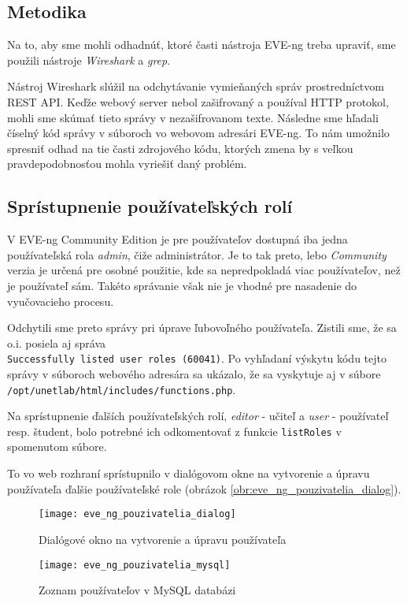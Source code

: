 \subsection{Metodika}

Na to, aby sme mohli odhadnúť, ktoré časti nástroja EVE-ng treba upraviť, sme použili nástroje \emph{Wireshark} a \emph{grep}.

Nástroj Wireshark slúžil na odchytávanie vymieňaných správ prostredníctvom REST API. Keďže webový server nebol zašifrovaný a používal HTTP protokol, mohli sme skúmať tieto správy v nezašifrovanom texte. Následne sme hľadali číselný kód správy v súboroch vo webovom adresári EVE-ng. To nám umožnilo spresniť odhad na tie časti zdrojového kódu, ktorých zmena by s veľkou pravdepodobnosťou mohla vyriešiť daný problém.






\subsection{Sprístupnenie používateľských rolí}
\label{chap:eve_ng_pouzivatelske_role}

V EVE-ng Community Edition je pre používateľov dostupná iba jedna používateľská rola \mbox{\emph{admin}}, čiže administrátor. Je to tak preto, lebo \emph{Community} verzia je určená pre osobné použitie, kde sa nepredpokladá viac používateľov, než je používateľ sám. Takéto správanie však nie je vhodné pre nasadenie do vyučovacieho procesu.

Odchytili sme preto správy pri úprave ľubovoľného používateľa. Zistili sme, že sa o.i. posiela aj správa \\
\texttt{Successfully listed user roles (60041)}. Po vyhľadaní výskytu kódu tejto správy v súboroch webového adresára sa ukázalo, že sa vyskytuje aj v súbore \\
\texttt{/opt/unetlab/html/includes/functions.php}.

Na sprístupnenie ďalších používateľských rolí, \emph{editor} - učiteľ a \emph{user} - používateľ resp. študent, bolo potrebné ich odkomentovať z funkcie \texttt{listRoles} v spomenutom súbore.

To vo web rozhraní sprístupnilo v dialógovom okne na vytvorenie a úpravu používateľa ďalšie používateľské role (obrázok \ref{obr:eve_ng_pouzivatelia_dialog}).

\begin{figure}
    \centering
    \texttt{[image: eve\_ng\_pouzivatelia\_dialog]}
    \caption{Dialógové okno na vytvorenie a úpravu používateľa}
    \label{obr:eve_ng_pouzivatelia_dialog}
    
    \centering
    \texttt{[image: eve\_ng\_pouzivatelia\_mysql]}
    \caption{Zoznam používateľov v MySQL databázi}
    \label{obr:eve_ng_pouzivatelia_mysql}
\end{figure}

